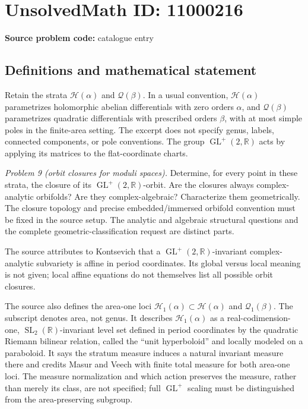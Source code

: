 \documentclass[11pt]{article}
\newcommand{\R}{\mathbb{R}}
\begin{document}
\section*{UnsolvedMath ID: 11000216}
\textbf{Source problem code:} catalogue entry
\subsection{Definitions and mathematical statement}
Retain the strata \(\mathcal H(\alpha)\) and \(\mathcal Q(\beta)\). In a usual convention, \(\mathcal H(\alpha)\) parametrizes holomorphic abelian differentials with zero orders \(\alpha\), and \(\mathcal Q(\beta)\) parametrizes quadratic differentials with prescribed orders \(\beta\), with at most simple poles in the finite-area setting. The excerpt does not specify genus, labels, connected components, or pole conventions. The group \(\operatorname{GL}^+(2,\R)\) acts by applying its matrices to the flat-coordinate charts.

\emph{Problem 9 (orbit closures for moduli spaces).} Determine, for every point in these strata, the closure of its \(\operatorname{GL}^+(2,\R)\)-orbit. Are the closures always complex-analytic orbifolds? Are they complex-algebraic? Characterize them geometrically. The closure topology and precise embedded/immersed orbifold convention must be fixed in the source setup. The analytic and algebraic structural questions and the complete geometric-classification request are distinct parts.

The source attributes to Kontsevich that a \(\operatorname{GL}^+(2,\R)\)-invariant complex-analytic subvariety is affine in period coordinates. Its global versus local meaning is not given; local affine equations do not themselves list all possible orbit closures.

The source also defines the area-one loci \(\mathcal H_1(\alpha)\subset\mathcal H(\alpha)\) and \(\mathcal Q_1(\beta)\). The subscript denotes area, not genus. It describes \(\mathcal H_1(\alpha)\) as a real-codimension-one, \(\operatorname{SL}_2(\R)\)-invariant level set defined in period coordinates by the quadratic Riemann bilinear relation, called the ``unit hyperboloid'' and locally modeled on a paraboloid. It says the stratum measure induces a natural invariant measure there and credits Masur and Veech with finite total measure for both area-one loci. The measure normalization and which action preserves the measure, rather than merely its class, are not specified; full \(\operatorname{GL}^+\) scaling must be distinguished from the area-preserving subgroup.
\end{document}
